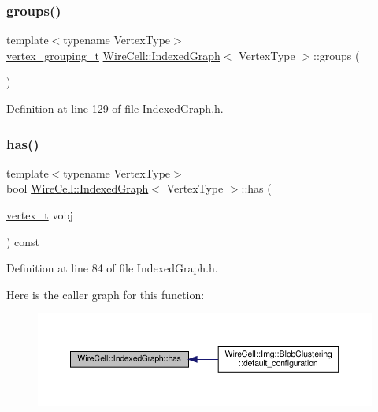 \subsubsection{\texorpdfstring{groups()}{groups()}}
{\footnotesize\ttfamily template$<$typename Vertex\+Type$>$ \\
\hyperlink{class_wire_cell_1_1_indexed_graph_af5e6a57c2c26d4f3036745cfe73a8a98}{vertex\+\_\+grouping\+\_\+t} \hyperlink{class_wire_cell_1_1_indexed_graph}{Wire\+Cell\+::\+Indexed\+Graph}$<$ Vertex\+Type $>$\+::groups (\begin{DoxyParamCaption}{ }\end{DoxyParamCaption})\hspace{0.3cm}{\ttfamily [inline]}}



Definition at line 129 of file Indexed\+Graph.\+h.

\mbox{\label{class_wire_cell_1_1_indexed_graph_a77bec91576cb23b64ea200cd03a5d686}} 
\subsubsection{\texorpdfstring{has()}{has()}}
{\footnotesize\ttfamily template$<$typename Vertex\+Type$>$ \\
bool \hyperlink{class_wire_cell_1_1_indexed_graph}{Wire\+Cell\+::\+Indexed\+Graph}$<$ Vertex\+Type $>$\+::has (\begin{DoxyParamCaption}\item[{\hyperlink{class_wire_cell_1_1_indexed_graph_ac26b25ac103373dde929a982d948d1b5}{vertex\+\_\+t}}]{vobj }\end{DoxyParamCaption}) const\hspace{0.3cm}{\ttfamily [inline]}}



Definition at line 84 of file Indexed\+Graph.\+h.

Here is the caller graph for this function\+:
\nopagebreak
\begin{figure}[H]
\begin{center}
\leavevmode
\includegraphics[width=350pt]{class_wire_cell_1_1_indexed_graph_a77bec91576cb23b64ea200cd03a5d686_icgraph}
\end{center}
\end{figure}
\mbox{\label{class_wire_cell_1_1_indexed_graph_ab26c470b918ae39eafe091a10ae8b119}} 
